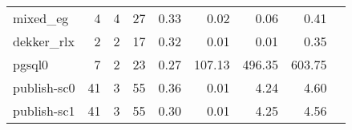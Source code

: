 {\begin{tabular}{l|r|r|r|r|r|r|r|l}
mixed\_eg                                   & 4                                                                                                 & 4                                                                                                & 27                                                                                                                   & 0.33                            & 0.02                    & {\color[HTML]{00009B} 0.06}    & 0.41                       &                                                         \\
dekker\_rlx                                 & 2                                                                                                 & 2                                                                                                & 17                                                                                                                   & 0.32                            & 0.01                    & {\color[HTML]{00009B} 0.01}    & 0.35                       														\\
pgsql0                                      & 7                                                                                                 & 2                                                                                                & 23                                                                                                                   & 0.27                            & 107.13                  & {\color[HTML]{00009B} 496.35}  & 603.75                     \\
publish-sc0                                 & 41                                                                                                & 3                                                                                                & 55                                                                                                                   & 0.36                            & 0.01                    & {\color[HTML]{00009B} 4.24}    & 4.60                       \\
publish-sc1                                 & 41                                                                                                & 3                                                                                                & 55                                                                                                                   & 0.30                            & 0.01                    & {\color[HTML]{00009B} 4.25}    & 4.56                       \\

\end{tabular}}
